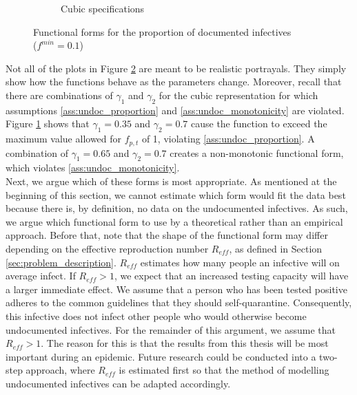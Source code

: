 \documentclass[12pt]{article}
\begin{document}
\begin{figure}[ht]
{\begin{subfigure}[pt]{0.48\linewidth}
	    \caption{Cubic specifications}
	    \label{fig:functional_forms_cubic}
	\end{subfigure}
    }
    
    \caption{Functional forms for the proportion of documented infectives \\($f^{min} = 0.1$)}
    \label{fig:functional_forms}
    \end{figure}
    
    Not all of the plots in Figure \ref{fig:functional_forms} are meant to be realistic portrayals. They simply show how the functions behave as the parameters change. Moreover, recall that there are combinations of $\gamma_1$ and $\gamma_2$ for the cubic representation for which assumptions \ref{ass:undoc_proportion} and \ref{ass:undoc_monotonicity} are violated. Figure \ref{fig:functional_forms_cubic} shows that $\gamma_1=0.35$ and $\gamma_2=0.7$ cause the function to exceed the maximum value allowed for $f_{p,t}$ of 1, violating \ref{ass:undoc_proportion}. A combination of $\gamma_1=0.65$ and $\gamma_2=0.7$ creates a non-monotonic functional form, which violates \ref{ass:undoc_monotonicity}. \\
    
    \newpage
    Next, we argue which of these forms is most appropriate. As mentioned at the beginning of this section, we cannot estimate which form would fit the data best because there is, by definition, no data on the undocumented infectives. As such, we argue which functional form to use by a theoretical rather than an empirical approach. Before that, note that the shape of the functional form may differ depending on the effective reproduction number $R_{eff}$, as defined in Section \ref{sec:problem_description}. $R_{eff}$ estimates how many people an infective will on average infect. If $R_{eff} > 1$, %
    we expect that an increased testing capacity will have a larger immediate effect. We assume that a person who has been tested positive adheres to the common guidelines that they should self-quarantine. Consequently, this infective does not infect other people who would otherwise become undocumented infectives. For the remainder of this argument, we assume that $R_{eff} > 1$. The reason for this is that the results from this thesis will be most important during an epidemic. Future research could be conducted into a two-step approach, where $R_{eff}$ is estimated first so that the method of modelling undocumented infectives can be adapted accordingly. \\
    
\end{document}
